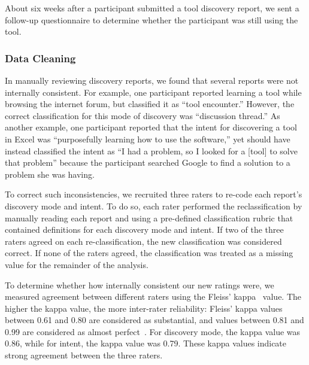 \documentclass[smallextended]{svjour3}
\begin{document}
About six weeks after a participant submitted a tool discovery report,
we sent a follow-up questionnaire to determine whether the participant was still
using the tool.

\subsubsection{Data Cleaning}\label{sec:cleaning}

\noindent
In manually reviewing discovery reports, we found that several reports
were not internally consistent.
For example, one participant reported learning a tool while browsing the internet forum,
but classified it as ``tool encounter.''
However, the correct classification for this mode of discovery was ``discussion thread.''
As another example, one participant reported that the intent for discovering 
a tool in Excel was ``purposefully learning how to use the software,'' 
yet should have instead classified the intent as ``I had a problem,
so I looked for a [tool] to solve that problem''
because the participant searched Google to find a solution to a problem she was having.

To correct such inconsistencies, we recruited three raters to re-code each report's 
discovery mode and intent.
To do so, each rater performed the reclassification by manually reading each report 
and using a pre-defined classification rubric that contained definitions 
for each discovery mode and intent.
If two of the three raters agreed on each re-classification, the new classification
was considered correct.
If none of the raters agreed, the classification was treated as a missing value for
the remainder of the analysis.

To determine whether how internally consistent our new ratings were,
we measured agreement between different raters using the Fleiss' kappa~\citep{fleiss1981measurement} value.
The higher the kappa value, the more inter-rater reliability:
Fleiss' kappa values between 0.61 and 0.80 are considered as substantial, 
and values between 0.81 and 0.99 are considered as almost perfect~\citep{landis77}. 
For discovery mode, the kappa value was 0.86, 
while for intent, the kappa value was 0.79.
These kappa values indicate strong agreement between the three raters.  
 
\end{document}
